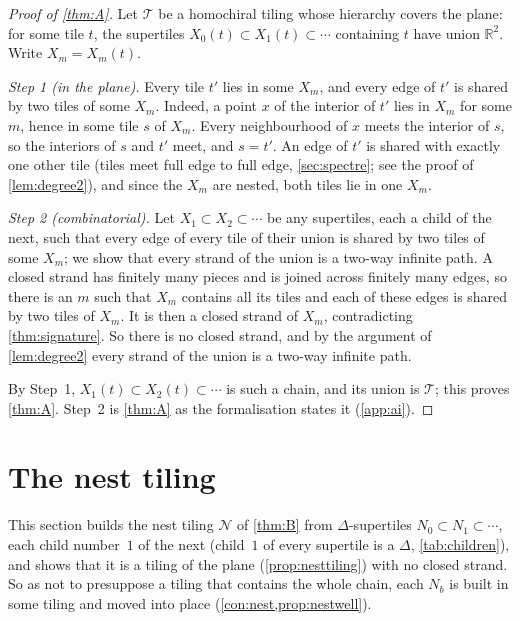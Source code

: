 \documentclass[11pt]{amsart}
\theoremstyle{definition}
\theoremstyle{remark}
\newcommand{\T}{\mathcal T}
\newcommand{\N}{\mathcal N}
\newcommand{\RR}{\mathbb R}
\begin{document}
\begin{proof}[Proof of \cref{thm:A}]
Let $\T$ be a homochiral tiling whose hierarchy covers the plane: for some tile $t$, the supertiles
$X_0(t)\subset X_1(t)\subset\cdots$ containing $t$ have union $\RR^2$. Write $X_m=X_m(t)$.

\emph{Step 1 (in the plane).} Every tile $t'$ lies in some $X_m$, and every edge of $t'$ is shared by two tiles of
some $X_m$. Indeed, a point $x$ of the interior of $t'$ lies in $X_m$ for some $m$, hence in some tile $s$ of $X_m$.
Every neighbourhood of $x$ meets the interior of $s$, so the interiors of $s$ and $t'$ meet, and $s=t'$. An edge of
$t'$ is shared with exactly one other tile (tiles meet full edge to full edge, \cref{sec:spectre}; see the proof of
\cref{lem:degree2}), and since the $X_m$ are nested, both tiles lie in one $X_m$.

\emph{Step 2 (combinatorial).} Let $X_1\subset X_2\subset\cdots$ be any supertiles, each a child of the next, such
that every edge of every tile of their union is shared by two tiles of some $X_m$; we show that every strand of the
union is a two-way infinite path. A closed strand has finitely many pieces and is joined across finitely many edges,
so there is an $m$ such that $X_m$ contains all its tiles and each of these edges is shared by two tiles of $X_m$. It
is then a closed strand of $X_m$, contradicting \cref{thm:signature}. So there is no closed strand, and by the
argument of \cref{lem:degree2} every strand of the union is a two-way infinite path.

By Step~1, $X_1(t)\subset X_2(t)\subset\cdots$ is such a chain, and its union is $\T$; this proves \cref{thm:A}.
Step~2 is \cref{thm:A} as the formalisation states it (\cref{app:ai}).
\end{proof}

\section{The nest tiling}\label{sec:nest}

This section builds the nest tiling $\N$ of \cref{thm:B} from $\Delta$-supertiles $N_0\subset N_1\subset\cdots$, each
child number~$1$ of the next (child~$1$ of every supertile is a $\Delta$, \cref{tab:children}), and shows that it is a
tiling of the plane (\cref{prop:nesttiling}) with no closed strand. So as not to presuppose a tiling that contains the
whole chain, each $N_b$ is built in some tiling and moved into place (\cref{con:nest,prop:nestwell}).
\end{document}
